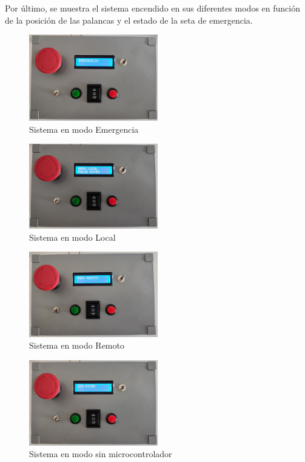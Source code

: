 Por último, se muestra el sistema encendido en sus diferentes modos en función de la posición
de las palancas y el estado de la seta de emergencia.

\begin{figure}[hbtp]%
    \centering 
        \includegraphics[width=0.5\textwidth]{07-resultados/modoemer.jpg}
    \caption{Sistema en modo Emergencia}
    \label{fig:modoemer} 
\end{figure}

\begin{figure}[hbtp]%
    \centering 
        \includegraphics[width=0.5\textwidth]{07-resultados/modolocal.jpg}
    \caption{Sistema en modo Local}
    \label{fig:modolocal} 
\end{figure}

\begin{figure}[hbtp]%
    \centering 
        \includegraphics[width=0.5\textwidth]{07-resultados/modoremoto.jpg}
    \caption{Sistema en modo Remoto}
    \label{fig:modoremoto}
\end{figure}

\begin{figure}[hbtp]%
    \centering 
        \includegraphics[width=0.5\textwidth]{07-resultados/modosinmicro.jpg}
    \caption{Sistema en modo sin microcontrolador}
    \label{fig:modosinmicro} 
\end{figure}
